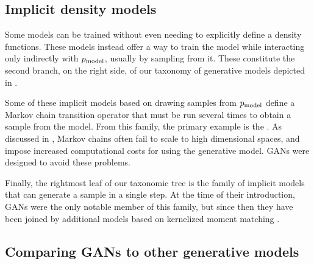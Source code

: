 \subsection{Implicit density models}

Some models can be trained without even needing to explicitly define a density
functions.
These models instead offer a way to train the model while interacting only
indirectly with $p_{\rm{model}}$, usually by sampling from it.
These constitute the second branch, on the right side, of our taxonomy of
generative models depicted in .

Some of these implicit models based on drawing samples from $p_{\rm{model}}$ define
a Markov chain transition operator that must be run several times to obtain
 a sample from the model.
From this family, the primary example is the 
\citep{Bengio-et-al-ICML-2014}.
As discussed in , Markov chains often fail to scale to high
dimensional spaces, and impose increased computational costs for using the
generative model. GANs were designed to avoid these problems.

Finally, the rightmost leaf of our taxonomic tree is the family of implicit models
that can generate a sample in a single step.
At the time of their introduction, GANs were the only notable member of this family,
but since then they have been joined by additional models based on
kernelized moment matching \citep{Li-et-al-2015,dziugaite2015training}.

\subsection{Comparing GANs to other generative models}

